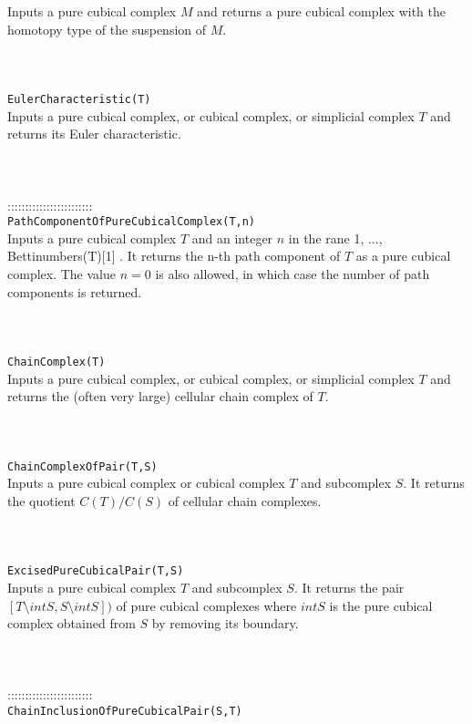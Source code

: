 \documentclass[a4paper,11pt]{report}
\begin{document}
{ Inputs a pure cubical complex $M$ and returns a pure cubical complex with the homotopy type of the suspension of $M$. \\
 \\
 \\
 \\
 \texttt{EulerCharacteristic(T)}\\
 

 Inputs a pure cubical complex, or cubical complex, or simplicial complex $T$ and returns its Euler characteristic. \\
 \\
 \\
 \\
 ::::::::::::::::::::::::\\
 \texttt{PathComponentOfPureCubicalComplex(T,n)}\\
 

 Inputs a pure cubical complex $T$ and an integer $n$ in the rane 1, ..., Bettinumbers(T)[1] . It returns the n-th path component of $T$ as a pure cubical complex. The value $n=0$ is also allowed, in which case the number of path components is returned. \\
 \\
 \\
 \\
 \texttt{ChainComplex(T)}\\
 

 Inputs a pure cubical complex, or cubical complex, or simplicial complex $T$ and returns the (often very large) cellular chain complex of $T$. \\
 \\
 \\
 \\
 \texttt{ChainComplexOfPair(T,S)}\\
 

 Inputs a pure cubical complex or cubical complex $T$ and subcomplex $S$. It returns the quotient $C(T)/C(S)$ of cellular chain complexes. \\
 \\
 \\
 \\
 \texttt{ExcisedPureCubicalPair(T,S)}\\
 

 Inputs a pure cubical complex $T$ and subcomplex $S$. It returns the pair $[T\setminus intS, S\setminus intS])$ of pure cubical complexes where $intS$ is the pure cubical complex obtained from $S$ by removing its boundary. \\
 \\
 \\
 \\
 ::::::::::::::::::::::::\\
 \texttt{ChainInclusionOfPureCubicalPair(S,T)}\\
 

}
\end{document}
